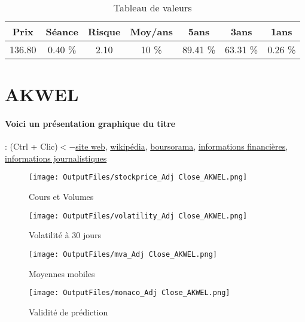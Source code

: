\documentclass[11pt,a4paper]{report}%
\begin{document}
\begin{table}[H]
  \centering
    \begin{tabular}{|c|c|c|c|c|c|c|}
    \hline
    Prix & Séance & Risque  & Moy/ans & 5ans & 3ans & 1ans \\
    \hline
    136.80 &    0.40 \%    & 2.10 & 10 \% & 89.41 \% & 63.31 \% & 0.26 \% \\
    \hline
    \end{tabular}%
        \label{tab:table_AIR LIQUIDE}%
      \caption{Tableau de valeurs}
\end{table}%

\newpage

\section{AKWEL}

\paragraph{Voici un présentation graphique du titre} : (Ctrl + Clic)$<-$\href{https://akwel-automotive.com/finance/investisseurs/}{site web}, \href{https://fr.wikipedia.org/wiki/Akwel}{wikipédia}, \href{https://www.boursorama.com/cours/1rPAKW}{boursorama}, \href{https://www.qwant.com/?q=site:https:%2f%2fwww.easybourse.com%2faction-societe%2fAKWEL&t=web&client=ext-firefox-hp}{informations financières}, \href{https://bourse.lerevenu.com/cours-de-bourse/fiche-valeur-synthese/AKWEL/AKW-FR}{informations journalistiques}
\begin{figure}[!htb]
   \begin{minipage}{0.5\textwidth}
     \centering
     \texttt{[image: OutputFiles/stockprice\_Adj Close\_AKWEL.png]}
     \caption{Cours et Volumes}\label{Fig:price_AKWEL}
   \end{minipage}\hfill
   \begin{minipage}{0.5\textwidth}
     \centering
     \texttt{[image: OutputFiles/volatility\_Adj Close\_AKWEL.png]}
     \caption{Volatilité à 30 jours}\label{Fig:volat_AKWEL}
   \end{minipage}
\end{figure}
\begin{figure}[!htb]
   \begin{minipage}{0.5\textwidth}
     \centering
     \texttt{[image: OutputFiles/mva\_Adj Close\_AKWEL.png]}
     \caption{Moyennes mobiles}\label{Fig:mva_AKWEL}
   \end{minipage}\hfill
   \begin{minipage}{0.5\textwidth}
     \centering
     \texttt{[image: OutputFiles/monaco\_Adj Close\_AKWEL.png]}
     \caption{Validité de prédiction}\label{Fig:prediction_AKWEL}
   \end{minipage}
\end{figure}
\end{document}
